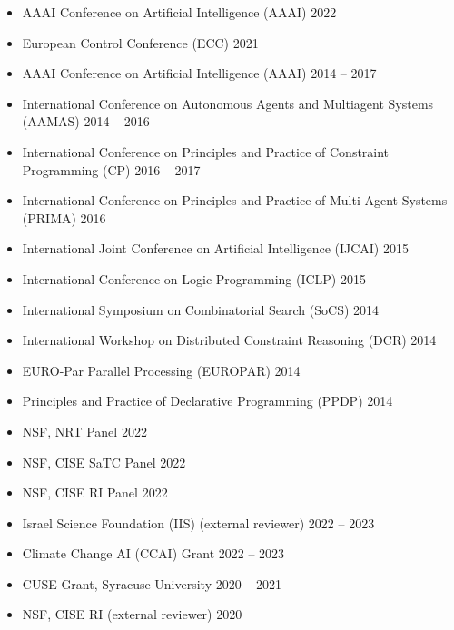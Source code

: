 \begin{itemize}
    \item AAAI Conference on Artificial Intelligence (AAAI) \hfill {2022}
\end{itemize}

\begin{itemize}
  
  \item European Control Conference (ECC) \hfill 2021

  \item AAAI Conference on Artificial Intelligence (AAAI) \hfill {2014 -- 2017}
  
  \item International Conference on Autonomous Agents and Multiagent Systems (AAMAS) \hfill {2014 -- 2016}
    
  \item International Conference on Principles and Practice of Constraint Programming (CP) \hfill{2016 -- 2017} 
  
  \item International Conference on Principles and Practice of Multi-Agent Systems (PRIMA) \hfill{2016}
  
  \item International Joint Conference on Artificial Intelligence (IJCAI) \hfill {2015}
  
  \item International Conference on Logic Programming (ICLP) \hfill {2015}
  
  \item International Symposium on Combinatorial Search (SoCS) \hfill {2014}
  
  \item International Workshop on Distributed Constraint Reasoning (DCR) \hfill 2014
  
  \item EURO-Par Parallel Processing (EUROPAR) \hfill {2014}
  
  \item Principles and Practice of Declarative Programming (PPDP) \hfill {2014}
\end{itemize}

\begin{itemize}
  \item 
  NSF, NRT Panel \hfill {2022}
  \item 
  NSF, CISE SaTC Panel \hfill {2022}
  \item 
  NSF, CISE RI Panel \hfill {2022}
  \item 
  Israel Science Foundation (IIS) (external reviewer) \hfill {2022 -- 2023}
  \item 
  Climate Change AI (CCAI) Grant \hfill {2022 -- 2023}
  \item 
  CUSE Grant, Syracuse University \hfill {2020 -- 2021}
  \item 
  NSF, CISE RI (external reviewer) \hfill {2020}
\end{itemize}


